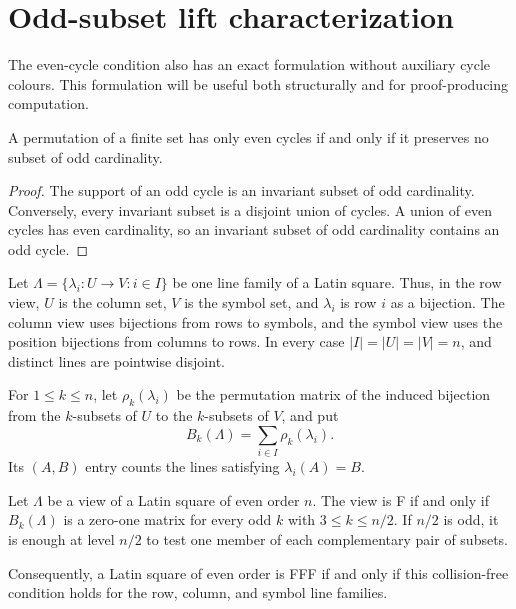 \section{Odd-subset lift characterization}
\label{sec:odd-subset-lifts}

The even-cycle condition also has an exact formulation without auxiliary
cycle colours.  This formulation will be useful both structurally and for
proof-producing computation.

\begin{lemma}\label{lem:invariant-odd-subset}
A permutation of a finite set has only even cycles if and only if it preserves
no subset of odd cardinality.
\end{lemma}

\begin{proof}
The support of an odd cycle is an invariant subset of odd cardinality.
Conversely, every invariant subset is a disjoint union of cycles.  A union of
even cycles has even cardinality, so an invariant subset of odd cardinality
contains an odd cycle.
\end{proof}

Let $\Lambda=\{\lambda_i:U\to V:i\in I\}$ be one line family of a Latin
square.  Thus, in the row view, $U$ is the column set, $V$ is the symbol set,
and $\lambda_i$ is row $i$ as a bijection.  The column view uses bijections
from rows to symbols, and the symbol view uses the position bijections from
columns to rows.  In every case $|I|=|U|=|V|=n$, and distinct lines are
pointwise disjoint.

For $1\leq k\leq n$, let $\rho_k(\lambda_i)$ be the permutation matrix of the
induced bijection from the $k$-subsets of $U$ to the $k$-subsets of $V$, and
put
\begin{equation}
 B_k(\Lambda)=\sum_{i\in I}\rho_k(\lambda_i).
 \label{eq:odd-subset-lift}
\end{equation}
Its $(A,B)$ entry counts the lines satisfying $\lambda_i(A)=B$.

\begin{theorem}
\label{thm:odd-subset-collision}
Let $\Lambda$ be a view of a Latin square of even order $n$.  The view is F if
and only if $B_k(\Lambda)$ is a zero-one matrix for every odd
$k$ with $3\leq k\leq n/2$.  If $n/2$ is odd, it is enough at level $n/2$ to
test one member of each complementary pair of subsets.

Consequently, a Latin square of even order is FFF if and only if this
collision-free condition holds for the row, column, and symbol line families.
\end{theorem}

